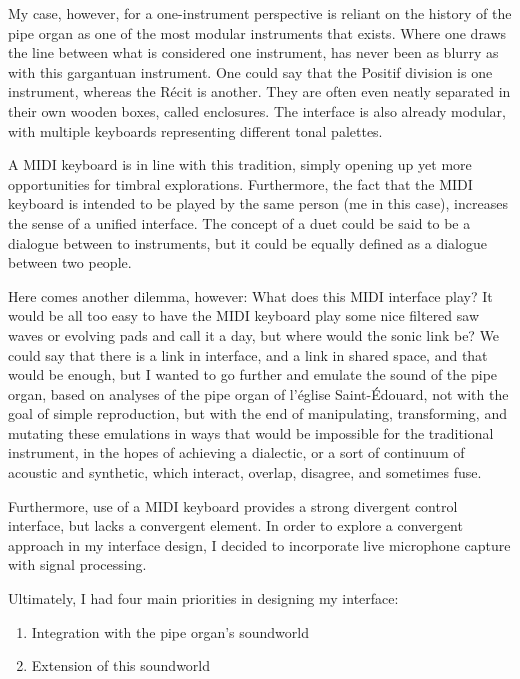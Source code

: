 \documentclass[12pt,twoside,maitrise]{dms_ks}
\theoremstyle{definition}
\begin{document}
{My case, however, for a one-instrument perspective is reliant on the history of the pipe organ as one of the most modular instruments that exists.
Where one draws the line between what is considered one instrument, has never been as blurry as with this gargantuan instrument.
One could say that the Positif division is one instrument, whereas the Récit is another.
They are often even neatly separated in their own wooden boxes, called enclosures.
The interface is also already modular, with multiple keyboards representing different tonal palettes.

A MIDI keyboard is in line with this tradition, simply opening up yet more opportunities for timbral explorations.
Furthermore, the fact that the MIDI keyboard is intended to be played by the same person (me in this case), increases the sense of a unified interface.
The concept of a duet could be said to be a dialogue between to instruments, but it could be equally defined as a dialogue between two people.

Here comes another dilemma, however: What does this MIDI interface play?
It would be all too easy to have the MIDI keyboard play some nice filtered saw waves or evolving pads and call it a day, but where would the sonic link be?
We could say that there is a link in interface, and a link in shared space, and that would be enough, but I wanted to go further and emulate the sound of the pipe organ, based on analyses of the pipe organ of l'église Saint-Édouard, not with the goal of simple reproduction, but with the end of manipulating, transforming, and mutating these emulations in ways that would be impossible for the traditional instrument, in the hopes of achieving a dialectic, or a sort of continuum of acoustic and synthetic, which interact, overlap, disagree, and sometimes fuse.

Furthermore, use of a MIDI keyboard provides a strong divergent control interface, but lacks a convergent element. In order to explore a convergent approach in my interface design, I decided to incorporate live microphone capture with signal processing. 

Ultimately, I had four main priorities in designing my interface:

\begin{enumerate}
  \item Integration with the pipe organ's soundworld

  \item Extension of this soundworld
   

\end{enumerate}}
\end{document}
